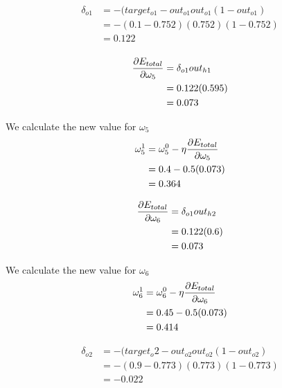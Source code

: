 \documentclass[10pt,a4paper]{article}
\begin{document}
\begin{equation}
\begin{split}
\delta_{o1} &= -(target_{o1} -out_{o1}out_{o1}(1-out_{o1})\\
            &= -(0.1-0.752)(0.752)(1-0.752)\\
            &= 0.122\\
\end{split}
\end{equation}

\begin{equation}
\begin{split}
\pdv{E_{total}}{\omega_5} &= \delta_{o1}out_{h1}\\
                          &= 0.122(0.595)\\
                          &= 0.073\\
\end{split}
\end{equation}

We calculate the new value for $\omega_5$
\begin{equation}
\begin{split}
\omega_5^1 &= \omega_5^0 - \eta\pdv{E_{total}}{\omega_5}\\
           &= 0.4 -0.5(0.073)\\
           &= 0.364\\
\end{split}
\end{equation}

\begin{equation}
\begin{split}
\pdv{E_{total}}{\omega_6} &= \delta_{o1}out_{h2}\\
                          &= 0.122(0.6)\\
                          &= 0.073\\
\end{split}
\end{equation}

We calculate the new value for $\omega_6$
\begin{equation}
\begin{split}
\omega_6^1 &= \omega_6^0 - \eta\pdv{E_{total}}{\omega_6}\\
           &= 0.45 -0.5(0.073)\\
           &= 0.414\\
\end{split}
\end{equation}

\begin{equation}
\begin{split}
\delta_{o2} &= -(target_o2 -out_{o2}out_{o2}(1-out_{o2})\\
            &= -(0.9-0.773)(0.773)(1-0.773)\\
            &= -0.022\\
\end{split}
\end{equation}
\end{document}
